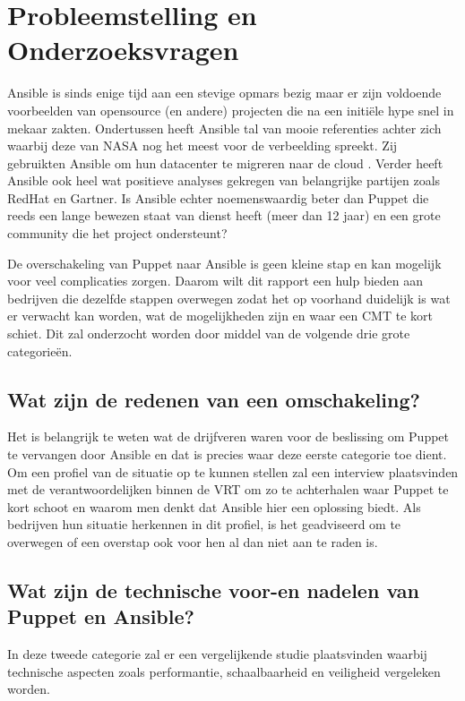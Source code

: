 \section{Probleemstelling en Onderzoeksvragen}
\label{sec:onderzoeksvragen}

Ansible is sinds enige tijd aan een stevige opmars bezig maar er zijn voldoende voorbeelden van opensource (en andere) projecten die na een initi\"ele hype snel in mekaar zakten. Ondertussen heeft Ansible tal van mooie referenties achter zich waarbij deze van NASA nog het meest voor de verbeelding spreekt. Zij gebruikten Ansible om hun datacenter te migreren naar de cloud \autocite{nasacasestudy}.  Verder heeft Ansible ook heel wat positieve analyses gekregen van belangrijke partijen zoals RedHat en Gartner. Is Ansible echter noemenswaardig beter dan Puppet die reeds een lange bewezen staat van dienst heeft (meer dan 12 jaar) en een grote community die het project ondersteunt?

De overschakeling van Puppet naar Ansible is geen kleine stap en kan mogelijk voor veel complicaties zorgen. Daarom wilt dit rapport een hulp bieden aan bedrijven die dezelfde stappen overwegen zodat het op voorhand duidelijk is wat er verwacht kan worden, wat de mogelijkheden zijn en waar een \gls{CMT} te kort schiet. Dit zal onderzocht worden door middel van de volgende drie grote categorie\"en. 


\subsection{Wat zijn de redenen van een omschakeling?}

Het is belangrijk te weten wat de drijfveren waren voor de beslissing om Puppet te vervangen door Ansible en dat is precies waar deze eerste categorie toe dient. Om een profiel van de situatie op te kunnen stellen zal een interview plaatsvinden met de verantwoordelijken binnen de VRT om zo te achterhalen waar Puppet te kort schoot en waarom men denkt dat Ansible hier een oplossing biedt. Als bedrijven hun situatie herkennen in dit profiel, is het geadviseerd om te overwegen of een overstap ook voor hen al dan niet aan te raden is.

\subsection{Wat zijn de technische voor-en nadelen van Puppet en Ansible?}

In deze tweede categorie zal er een vergelijkende studie plaatsvinden waarbij technische aspecten zoals performantie, schaalbaarheid en veiligheid vergeleken worden. 
 
